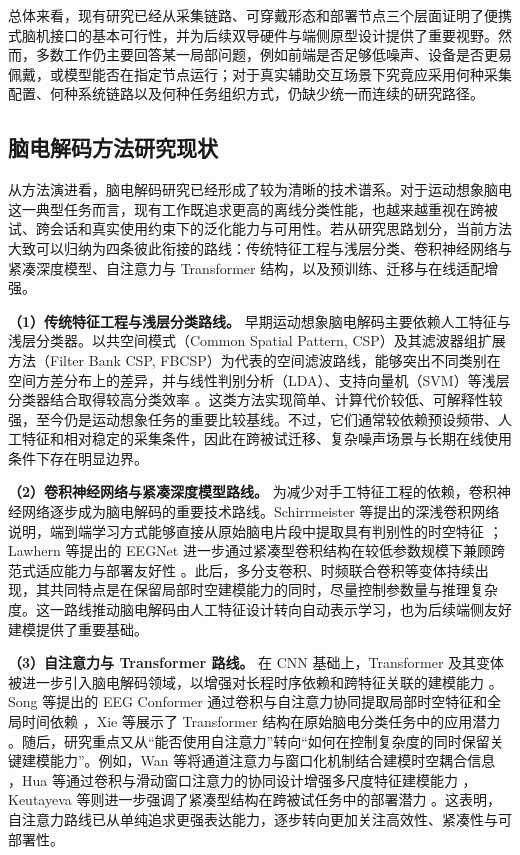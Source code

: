 总体来看，现有研究已经从采集链路、可穿戴形态和部署节点三个层面证明了便携式脑机接口的基本可行性，并为后续双导硬件与端侧原型设计提供了重要视野。然而，多数工作仍主要回答某一局部问题，例如前端是否足够低噪声、设备是否更易佩戴，或模型能否在指定节点运行；对于真实辅助交互场景下究竟应采用何种采集配置、何种系统链路以及何种任务组织方式，仍缺少统一而连续的研究路径。

\subsection{脑电解码方法研究现状}

从方法演进看，脑电解码研究已经形成了较为清晰的技术谱系。对于运动想象脑电这一典型任务而言，现有工作既追求更高的离线分类性能，也越来越重视在跨被试、跨会话和真实使用约束下的泛化能力与可用性。若从研究思路划分，当前方法大致可以归纳为四条彼此衔接的路线：传统特征工程与浅层分类、卷积神经网络与紧凑深度模型、自注意力与 Transformer 结构，以及预训练、迁移与在线适配增强。

\textbf{（1）传统特征工程与浅层分类路线。} 早期运动想象脑电解码主要依赖人工特征与浅层分类器。以共空间模式（Common Spatial Pattern, CSP）及其滤波器组扩展方法（Filter Bank CSP, FBCSP）为代表的空间滤波路线，能够突出不同类别在空间方差分布上的差异，并与线性判别分析（LDA）、支持向量机（SVM）等浅层分类器结合取得较高分类效率 \cite{ang2012filter, lotte2018review}。这类方法实现简单、计算代价较低、可解释性较强，至今仍是运动想象任务的重要比较基线。不过，它们通常较依赖预设频带、人工特征和相对稳定的采集条件，因此在跨被试迁移、复杂噪声场景与长期在线使用条件下存在明显边界。

\textbf{（2）卷积神经网络与紧凑深度模型路线。} 为减少对手工特征工程的依赖，卷积神经网络逐步成为脑电解码的重要技术路线。Schirrmeister 等提出的深浅卷积网络说明，端到端学习方式能够直接从原始脑电片段中提取具有判别性的时空特征 \cite{schirrmeister2017deep}；Lawhern 等提出的 EEGNet 进一步通过紧凑型卷积结构在较低参数规模下兼顾跨范式适应能力与部署友好性 \cite{lawhern2018eegnet}。此后，多分支卷积、时频联合卷积等变体持续出现，其共同特点是在保留局部时空建模能力的同时，尽量控制参数量与推理复杂度。这一路线推动脑电解码由人工特征设计转向自动表示学习，也为后续端侧友好建模提供了重要基础。

\textbf{（3）自注意力与 Transformer 路线。} 在 CNN 基础上，Transformer 及其变体被进一步引入脑电解码领域，以增强对长程时序依赖和跨特征关联的建模能力 \cite{vaswani2017attention}。Song 等提出的 EEG Conformer 通过卷积与自注意力协同提取局部时空特征和全局时间依赖 \cite{songEEG2022}，Xie 等展示了 Transformer 结构在原始脑电分类任务中的应用潜力 \cite{xie_transformer-based_2022}。随后，研究重点又从“能否使用自注意力”转向“如何在控制复杂度的同时保留关键建模能力”。例如，Wan 等将通道注意力与窗口化机制结合建模时空耦合信息 \cite{wan2023novel}，Hua 等通过卷积与滑动窗口注意力的协同设计增强多尺度特征建模能力 \cite{hua2023improved}，Keutayeva 等则进一步强调了紧凑型结构在跨被试任务中的部署潜力 \cite{keu2024compact}。这表明，自注意力路线已从单纯追求更强表达能力，逐步转向更加关注高效性、紧凑性与可部署性。

